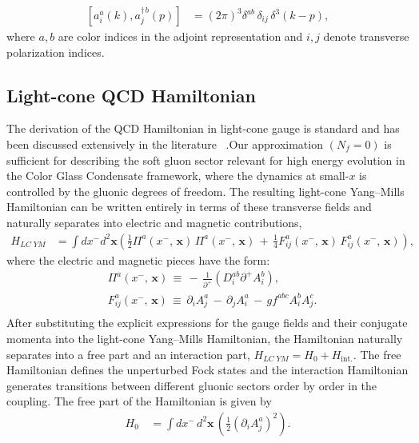 \documentclass[a4paper,11pt]{article}
\begin{document}
\begin{align}
\left[a^{a}_{i}(k), a^{\dagger\, b}_{j}(p) \right] & = (2\pi)^{3}
\delta^{ab}\,\delta_{ij}\,\delta^{3}(k-p),
\end{align}
where $a,b$ are color indices in the adjoint representation and $i,j$ denote transverse polarization indices.
\subsection{Light-cone QCD Hamiltonian}
The derivation of the QCD Hamiltonian in light-cone gauge is standard and has been discussed extensively in the literature ~\cite{Lublinsky:2016meo,kovner2005high,Kovner:2005jc}.Our approximation $(N_{f} = 0)$ is sufficient for describing the soft gluon sector relevant for high energy evolution in the Color Glass Condensate framework, where the dynamics at small-$x$ is controlled by the gluonic degrees of freedom. The resulting light-cone Yang–Mills Hamiltonian can be written entirely in terms of these transverse fields and naturally separates into electric and magnetic contributions,
\begin{align}\label{eq:LCQCD}
H_{LC\; YM}
& =\int dx^{-}d^{2}\mathbf{x}\left(\frac{1}{2}\Pi^{a}(x^{-},\, \mathbf{x})\,\Pi^{a}(x^{-},\, \mathbf{x})\,+\,\frac{1}{4}F_{ij}^{a}(x^{-},\, \mathbf{x})\, F_{ij}^{a}(x^{-},\, \mathbf{x})\right),
\end{align}
where  the electric and magnetic pieces have the form:
 \begin{equation}\begin{split}
&\Pi^{a}(x^{-},\,\mathbf{x})\,\equiv\,-\,\frac{1}{\partial^{+}}(D_{i}^{ab}\partial^{+}A_{i}^{b}),\\
&F_{ij}^{a}(x^{-},\,\mathbf{x})\,\equiv\,\partial_{i}A_{j}^{a}\,-\,\partial_{j}A_{i}^{a}\,-\, gf^{abc}A_{i}^{b}A_{j}^{c}.\\
\end{split}\end{equation}
After substituting the explicit expressions for the gauge fields and their conjugate momenta into the light-cone Yang–Mills Hamiltonian, the Hamiltonian naturally separates into a free part and an interaction part, $H_{LC\; YM} = H_{0} + H_{\text{int.}}$. The free Hamiltonian defines the unperturbed Fock states and the interaction Hamiltonian generates transitions between different gluonic sectors order by order in the coupling. The free part of the Hamiltonian is given by
\begin{align}\label{eq:free}
    H_{0}\, & = \int dx^{-}\, d^{2}\mathbf{x}\,\left(\frac{1}{2}(\partial_{i}A_{j}^{a})^{2}\right).
\end{align}
\end{document}
